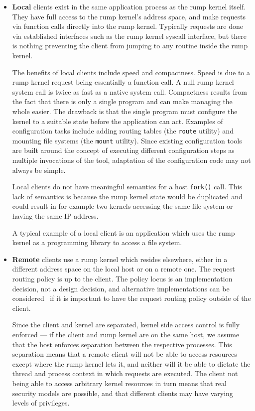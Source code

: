 \begin{itemize}
\item   \textbf{Local} clients exist in the same application process
	as the rump kernel itself.  They have full access to the
	rump kernel's address space, and make requests via function
	calls directly into the rump kernel.  Typically requests
	are done via established interfaces such as the rump kernel
	syscall interface, but there is nothing preventing the client
	from jumping to any routine inside the rump kernel.

	The benefits of local clients include speed and compactness.
	Speed is due to a rump kernel request being essentially a
	function call.	A null rump kernel system call is twice as fast
	as a native system call.  Compactness results from the fact that
	there is only a single program and can make managing the whole
	easier.  The drawback is that the single program must configure
	the kernel to a suitable state before the application can act.
	Examples of configuration tasks include adding routing tables
	(the \texttt{route} utility) and mounting file systems (the
	\texttt{mount} utility).  Since existing configuration tools are
	built around the concept of executing different configuration
	steps as multiple invocations of the tool, adaptation of the
	configuration code may not always be simple.

	Local clients do not have meaningful semantics
	for a host \texttt{fork()} call.  This lack of semantics is
	because the rump kernel state would be duplicated and could
	result in for example two kernels accessing the same file system
	or having the same IP address.

	A typical example of a local client is an application which
	uses the rump kernel as a programming library \eg to access
	a file system.

\item	\textbf{Remote} clients use a rump kernel which resides
	elsewhere, either in a different address space on the local host or on a remote one.  The request
	routing policy is up to the client.  The policy locus is an
	implementation decision, not a design decision, and alternative
	implementations can be considered~\cite{gardenghi:viewos} if
	it is important to have the request routing policy outside of
	the client.

	Since the client and kernel are separated, kernel side
	access control is fully enforced --- if the client and rump
	kernel are on the same host, we assume that the host enforces
	separation between the respective processes.  This separation
	means that a remote client will not be able to access resources
	except where the rump kernel lets it, and neither will it be able
	to dictate the thread and process context in which requests are
	executed.  The client not being able to access arbitrary kernel
	resources in turn means that real security models are possible,
	and that different clients may have varying levels of privileges.


\end{itemize}
